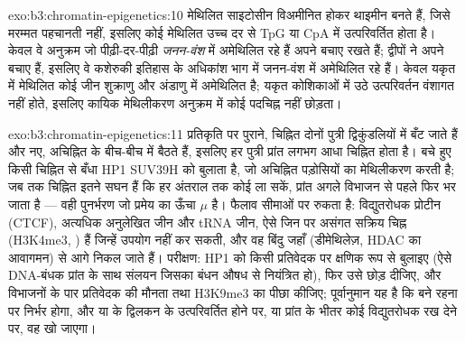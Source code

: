 \begin{solution}{exo:b3:chromatin-epigenetics:10}
मेथिलित साइटोसीन विअमीनित होकर थाइमीन बनते हैं, जिसे मरम्मत पहचानती
नहीं, इसलिए कोई मेथिलित  उच्च दर से TpG या CpA में उत्परिवर्तित
होता है। केवल वे अनुक्रम जो पीढ़ी-दर-पीढ़ी \emph{जनन-वंश} में अमेथिलित
रहे हैं अपने  बचाए रखते हैं; द्वीपों ने अपने बचाए हैं, इसलिए वे
कशेरुकी इतिहास के अधिकांश भाग में जनन-वंश में अमेथिलित रहे हैं। केवल
यकृत में मेथिलित कोई जीन शुक्राणु और अंडाणु में अमेथिलित है; यकृत
कोशिकाओं में उठे उत्परिवर्तन वंशागत नहीं होते, इसलिए कायिक मेथिलीकरण
अनुक्रम में कोई पदचिह्न नहीं छोड़ता।
\end{solution}

\begin{solution}{exo:b3:chromatin-epigenetics:11}
प्रतिकृति पर पुराने, चिह्नित  दोनों पुत्री द्विकुंडलियों में
बँट जाते हैं और नए, अचिह्नित  के बीच-बीच में बैठते हैं, इसलिए
हर पुत्री प्रांत लगभग आधा चिह्नित होता है। बचे हुए किसी चिह्नित
 से बँधा HP1 SUV39H को बुलाता है, जो अचिह्नित पड़ोसियों का
मेथिलीकरण करती है; जब तक चिह्नित  इतने सघन हैं कि हर
अंतराल तक कोई  ला सकें, प्रांत अगले विभाजन से पहले फिर भर जाता है
--- वही पुनर्भरण जो प्रमेय का ऊँचा $\mu$ है। फैलाव सीमाओं पर रुकता है:
विद्युतरोधक प्रोटीन (CTCF), अत्यधिक अनुलेखित जीन और tRNA जीन, ऐसे
 जिन पर असंगत सक्रिय चिह्न (H3K4me3, ) हैं
जिन्हें  उपयोग नहीं कर सकती, और वह बिंदु जहाँ  (डीमेथिलेज़,
HDAC का आवागमन)  से आगे निकल जाते हैं। परीक्षण: HP1 को किसी
प्रतिवेदक पर क्षणिक रूप से बुलाइए (ऐसे DNA-बंधक प्रांत के साथ संलयन
जिसका बंधन औषध से नियंत्रित हो), फिर उसे छोड़ दीजिए, और विभाजनों के
पार प्रतिवेदक की मौनता तथा H3K9me3 का पीछा कीजिए; पूर्वानुमान यह है कि
बने रहना  पर निर्भर होगा, और  या  के द्विलकन के
उत्परिवर्तित होने पर, या प्रांत के भीतर कोई विद्युतरोधक रख देने पर,
वह खो जाएगा।
\end{solution}

